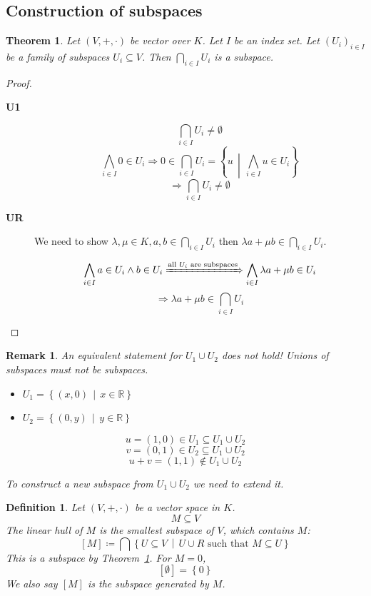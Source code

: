 \documentclass[a4paper,landscape,twocolumn]{article}
\newcommand\set[1]{\left\{#1\right\}}
\newcommand\setdef[2]{\left\{#1\,\middle|\,#2\right\}}
\newtheorem{theorem}{Theorem}
\newtheorem{defi}{Definition}
\newtheorem{rem}{Remark}
\begin{document}
\subsection{Construction of subspaces}

\begin{theorem}
  \label{satz-3-6}
  Let $(V, +, \cdot)$ be vector over $K$. Let $I$ be an index set.
  Let $(U_i)_{i \in I}$ be a family of subspaces $U_i \subseteq V$.
  Then $\bigcap_{i \in I} U_i$ is a subspace.
\end{theorem}

\begin{proof}
  \begin{description}
    \item[\textbf{U1}]
      \[ \bigcap_{i \in I} U_i \neq \emptyset \]
      \[ \bigwedge_{i \in I} 0 \in U_i \Rightarrow 0 \in \bigcap_{i \in I} U_i = \setdef{u}{\bigwedge_{i \in I} u \in U_i} \]
      \[ \Rightarrow \bigcap_{i \in I} U_i \neq \emptyset \]
    \item[\textbf{UR}]
      We need to show $\lambda, \mu \in K, a, b \in \bigcap_{i \in I} U_i$
      then $\lambda a + \mu b \in \bigcap_{i \in I} U_i$.

      \[
          \bigwedge_{i \in I} a \in U_i \land b \in U_i
          \xRightarrow{\text{all } U_i \text{ are subspaces}}
          \bigwedge_{i \in I} \lambda a + \mu b \in U_i
      \]
      \[ \Rightarrow \lambda a + \mu b \in \bigcap_{i \in I} U_i \]
  \end{description}
\end{proof}

\begin{rem}
  An equivalent statement for $U_1 \cup U_2$ does not hold!
  Unions of subspaces must not be subspaces.

  \begin{itemize}
    \item $U_1 = \setdef{(x, 0)}{x \in \mathbb R}$
    \item $U_2 = \setdef{(0, y)}{y \in \mathbb R}$
  \end{itemize}

  \[ u = (1, 0) \in U_1 \subseteq U_1 \cup U_2 \]
  \[ v = (0, 1) \in U_2 \subseteq U_1 \cup U_2 \]
  \[ u + v = (1, 1) \not\in U_1 \cup U_2 \]

  To construct a new subspace from $U_1 \cup U_2$ we need to extend it.
\end{rem}

\begin{defi}
  Let $(V, +, \cdot)$ be a vector space in $K$.
  \[ M \subseteq V \]
  The linear hull of $M$ is the smallest subspace of $V$, which contains $M$:
  \[ [M] \coloneqq \bigcap\setdef{U \subseteq V}{U \cup R \text{ such that } M \subseteq U} \]
  This is a subspace by Theorem~\ref{satz-3-6}.
  For $M = 0$,
  \[ [\emptyset] = \set{0} \]
  We also say $[M]$ is the \emph{subspace generated by $M$}.
\end{defi}
\end{document}
